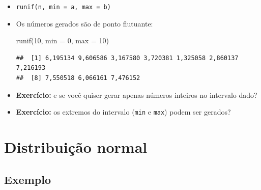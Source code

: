 \documentclass[
  11pt]{report}
\newenvironment{Shaded}{\begin{snugshade}}{\end{snugshade}}
\newcommand{\AttributeTok}[1]{\textcolor[rgb]{0.77,0.63,0.00}{#1}}
\newcommand{\DecValTok}[1]{\textcolor[rgb]{0.00,0.00,0.81}{#1}}
\newcommand{\FunctionTok}[1]{\textcolor[rgb]{0.00,0.00,0.00}{#1}}
\newcommand{\NormalTok}[1]{#1}
\renewenvironment{Shaded}{
    \begin{mdframed}[%
      roundcorner=2pt,%
      innerleftmargin=5pt,%
      innerrightmargin=5pt,%
      topline=true,%
      leftline=true,%
      rightline=true,%
      bottomline=true,%
      linewidth=0.5pt,%
      linecolor=black!20,%
      backgroundcolor=black!2,%
      skipabove=2ex,%
      skipbelow=2.5ex%
    ]%
  }
  {
    \end{mdframed}
  }
\begin{document}
\begin{itemize}
\item
  \texttt{runif(n,\ min\ =\ a,\ max\ =\ b)}
\item
  Os números gerados são de ponto flutuante:

\begin{Shaded}
\begin{Highlighting}[]
\FunctionTok{runif}\NormalTok{(}\DecValTok{10}\NormalTok{, }\AttributeTok{min =} \DecValTok{0}\NormalTok{, }\AttributeTok{max =} \DecValTok{10}\NormalTok{)}
\end{Highlighting}
\end{Shaded}

\begin{verbatim}
##  [1] 6,195134 9,606586 3,167580 3,720381 1,325058 2,860137 7,216193
##  [8] 7,550518 6,066161 7,476152
\end{verbatim}
\item
  \textbf{Exercício:} e se você quiser gerar apenas números inteiros no intervalo dado?
\item
  \textbf{Exercício:} os extremos do intervalo (\texttt{min} e \texttt{max}) podem ser gerados?
\end{itemize}

\hypertarget{distribuiuxe7uxe3o-normal}{%
\section{Distribuição normal}\label{distribuiuxe7uxe3o-normal}}

\hypertarget{exemplo-6}{%
\subsection{Exemplo}\label{exemplo-6}}
\end{document}
